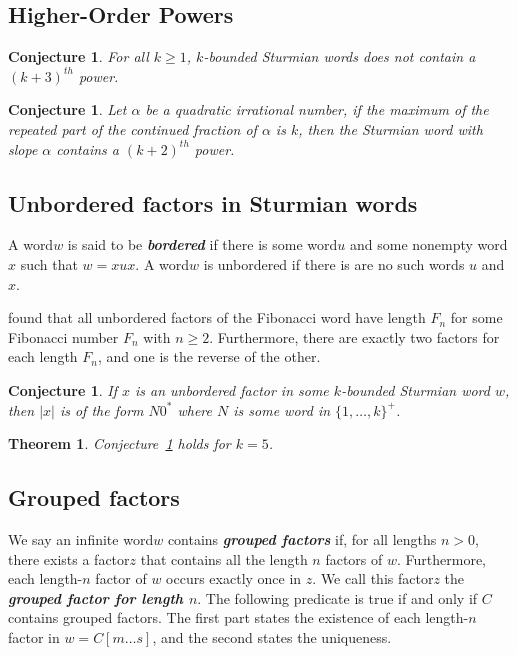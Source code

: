 \documentclass[a4paper]{article}
\newcommand{\word}{word\xspace}
\newcommand{\factor}{factor\xspace}
\newcommand{\term}[1]{\emph{\textbf{#1}}}
\theoremstyle{definition}
\theoremstyle{remark}
\theoremstyle{remark}
\theoremstyle{plain}
\newtheorem{theorem}[definition]{Theorem}
\newtheorem{conjecture}[definition]{Conjecture}
\begin{document}
\subsection{Higher-Order Powers}

\begin{conjecture}
    For all $k\ge 1$, $k$-bounded Sturmian words does not contain a $(k+3)^{th}$ power.
\end{conjecture}

\begin{conjecture}
    Let $\alpha$ be a quadratic irrational number, if the maximum of the repeated part of the continued fraction of $\alpha$ is $k$, then the Sturmian word with slope $\alpha$ contains a $(k+2)^{th}$ power.
\end{conjecture}

\subsection{Unbordered factors in Sturmian words}\label{sec:unbordered}

A \word $w$ is said to be \term{bordered} if there is some \word $u$ and some nonempty \word $x$ such that $w = xux$.
A \word $w$ is unbordered if there is are no such \word{}s $u$ and $x$.

\citeauthor{fibword} found that all unbordered \factor{}s of the Fibonacci word have length $F_n$ for some Fibonacci number $F_n$ with $n \geq 2$.
Furthermore, there are exactly two \factor{}s for each length $F_n$, and one is the reverse of the other.

\begin{conjecture}\label{conj:unbordered}
    If $x$ is an unbordered \factor in some $k$-bounded Sturmian word $w$, then $|x|$ is of the form $N0^*$ where $N$ is some \word in $\{1,\ldots,k\}^+$.
\end{conjecture}

\begin{theorem}\label{thm:unbordered}
Conjecture~\ref{conj:unbordered} holds for $k = 5$.
\end{theorem}

\subsection{Grouped factors}

We say an infinite \word $w$ contains \term{grouped factors} if, for all lengths $n > 0$, there exists a \factor $z$ that contains all the  length $n$ \factor{}s of $w$.
Furthermore, each length-$n$ \factor of $w$ occurs exactly once in $z$.
We call this \factor $z$ the \term{grouped factor for length $n$}.
The following predicate is true if and only if $C$ contains grouped factors.
The first part states the existence of each length-$n$ \factor in $w = C[m \ldots s]$, and the second states the uniqueness.
\end{document}
